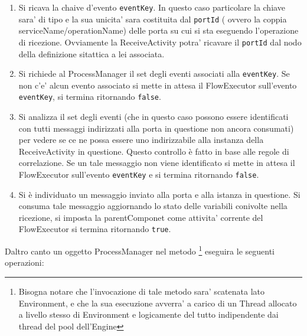 \begin{enumerate}
  \item Si ricava la chaive d'evento \texttt{eventKey}. In questo caso
  particolare la chiave sara' di tipo  e la sua
  unicita' sara costituita dal \texttt{portId} ( ovvero la coppia 
  serviceName/operationName) delle porta su cui si sta eseguendo l'operazione di 
  ricezione. Ovviamente la ReceiveActivity potra' ricavare il \texttt{portId}
  dal nodo della definizione sitattica a lei associata.
  
  \item Si richiede al ProcessManager il set degli eventi associati alla
  \texttt{eventKey}. Se non c'e' alcun evento associato si mette in attesa il
  FlowExecutor sull'evento \texttt{eventKey}, si termina ritornando
  \texttt{false}.
  
  \item Si analizza il set degli eventi (che in questo caso possono essere
  identificati con tutti messaggi indirizzati alla porta in questione non
  ancora consumati) per vedere se ce ne possa essere uno indirizzabile alla
  instanza della ReceiveActivity in questione. Questo controllo \`e fatto in
  base alle regole di correlazione. Se un tale messaggio non viene identificato
  si mette in attesa il FlowExecutor sull'evento \texttt{eventKey} e si termina
  ritornando \texttt{false}. 
  
  \item Si \`e individuato un messaggio inviato alla porta e alla istanza in
  questione. Si consuma tale messaggio aggiornando lo stato delle variabili
  conivolte nella ricezione, si imposta la parentComponet come attivita'
  corrente del FlowExecutor si termina ritornando \texttt{true}.
\end{enumerate}

Daltro canto un oggetto ProcessManager nel metodo \footnote{Bisogna notare che
l'invocazione di tale metodo sara' scatenata lato Environment, e che la sua
esecuzione avverra' a carico di un Thread allocato a livello stesso di
Environment e logicamente del tutto indipendente dai thread del pool
dell'Engine} eseguira le seguenti operazioni:

